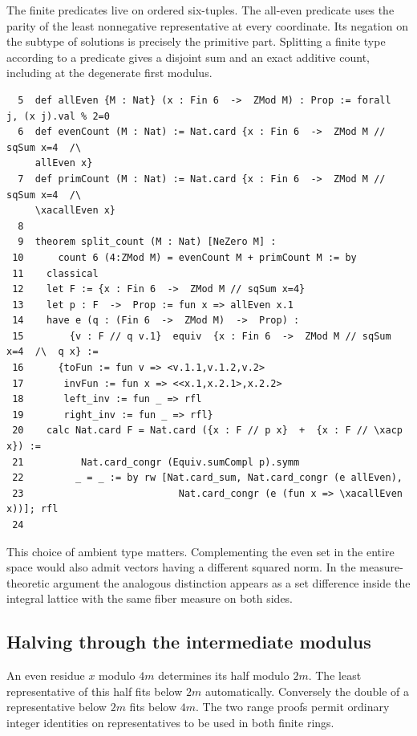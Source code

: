\documentclass[12pt,letterpaper]{article}
\begin{document}
The finite predicates live on ordered six-tuples. The all-even predicate uses the parity of the least nonnegative representative at every coordinate. Its negation on the subtype of solutions is precisely the primitive part. Splitting a finite type according to a predicate gives a disjoint sum and an exact additive count, including at the degenerate first modulus.
\par
{\fontsize{9.2}{11.2}\selectfont\begin{verbatim}
  5  def allEven {M : Nat} (x : Fin 6  ->  ZMod M) : Prop := forall  j, (x j).val % 2=0
  6  def evenCount (M : Nat) := Nat.card {x : Fin 6  ->  ZMod M // sqSum x=4  /\
     allEven x}
  7  def primCount (M : Nat) := Nat.card {x : Fin 6  ->  ZMod M // sqSum x=4  /\
     \xacallEven x}
  8
  9  theorem split_count (M : Nat) [NeZero M] :
 10      count 6 (4:ZMod M) = evenCount M + primCount M := by
 11    classical
 12    let F := {x : Fin 6  ->  ZMod M // sqSum x=4}
 13    let p : F  ->  Prop := fun x => allEven x.1
 14    have e (q : (Fin 6  ->  ZMod M)  ->  Prop) :
 15        {v : F // q v.1}  equiv  {x : Fin 6  ->  ZMod M // sqSum x=4  /\  q x} :=
 16      {toFun := fun v => <v.1.1,v.1.2,v.2>
 17       invFun := fun x => <<x.1,x.2.1>,x.2.2>
 18       left_inv := fun _ => rfl
 19       right_inv := fun _ => rfl}
 20    calc Nat.card F = Nat.card ({x : F // p x}  +  {x : F // \xacp x}) :=
 21          Nat.card_congr (Equiv.sumCompl p).symm
 22         _ = _ := by rw [Nat.card_sum, Nat.card_congr (e allEven),
 23                           Nat.card_congr (e (fun x => \xacallEven x))]; rfl
 24
\end{verbatim}}
This choice of ambient type matters. Complementing the even set in the entire space would also admit vectors having a different squared norm. In the measure-theoretic argument the analogous distinction appears as a set difference inside the integral lattice with the same fiber measure on both sides.
\clearpage{}\subsection*{Halving through the intermediate modulus}\label{extract-FourEven25}
An even residue $x$ modulo $4m$ determines its half modulo $2m$. The least representative of this half fits below $2m$ automatically. Conversely the double of a representative below $2m$ fits below $4m$. The two range proofs permit ordinary integer identities on representatives to be used in both finite rings.
\end{document}
